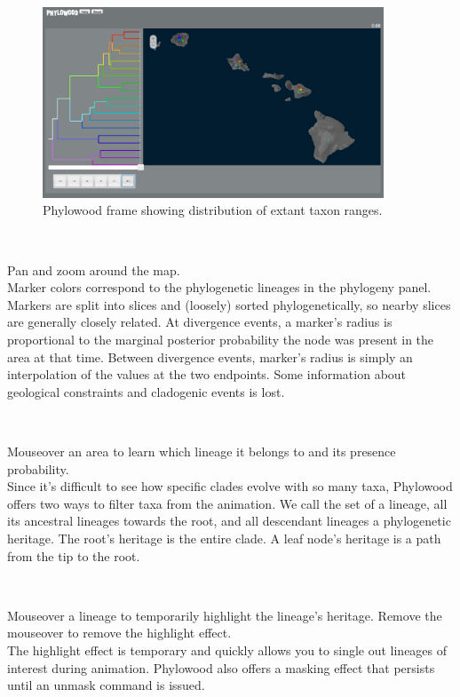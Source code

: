 \documentclass[11pt]{article}
\newcommand{\impmark}{\strut\vadjust{\domark}}
\newcommand{\domark}{%
  \vbox to 0pt{
    \kern-\dp\strutbox
    \smash{\llap{$\rightarrow$\kern1em}}
    \vss
  }%
}
\begin{document}
\begin{figure}[H]
\centering
\includegraphics[width=4in]{figures/phw_all}
\caption{Phylowood frame showing distribution of extant taxon ranges.}
\end{figure}

\noindent \\ \impmark Pan and zoom around the map.\\

Marker colors correspond to the phylogenetic lineages in the phylogeny panel.
Markers are split into slices and (loosely) sorted phylogenetically, so nearby slices are generally closely related.
At divergence events, a marker's radius is proportional to the marginal posterior probability the node was present in the area at that time.
Between divergence events, marker's radius is simply an interpolation of the values at the two endpoints.
Some information about geological constraints and cladogenic events is lost.

\noindent \\ \impmark Mouseover an area to learn which lineage it belongs to and its presence probability. \\

Since it's difficult to see how specific clades evolve with so many taxa, Phylowood offers two ways to filter taxa from the animation.
We call the set of a lineage, all its ancestral lineages towards the root, and all descendant lineages a phylogenetic heritage.
The root's heritage is the entire clade.
A leaf node's heritage is a path from the tip to the root.

\noindent \\ \impmark Mouseover a lineage to temporarily highlight the lineage's heritage. Remove the mouseover to remove the highlight effect. \\

The highlight effect is temporary and quickly allows you to single out lineages of interest during animation.
Phylowood also offers a masking effect that persists until an unmask command is issued.
\end{document}
